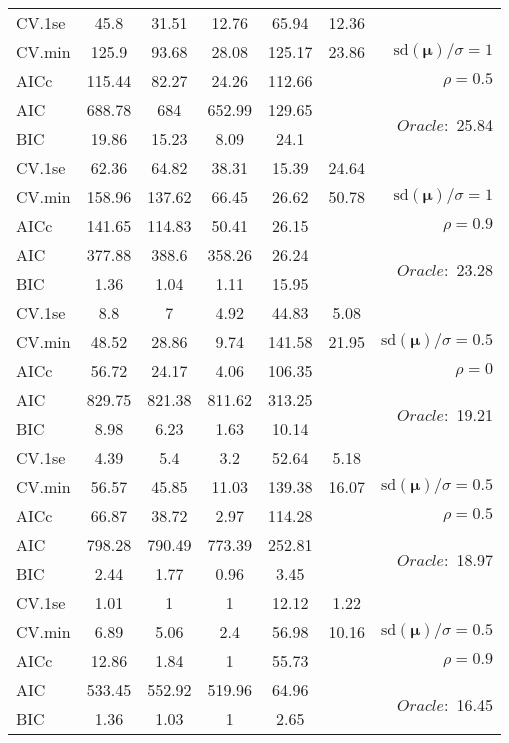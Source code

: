 \begin{table}
\begin{center}
\begin{tabular}{l*{5}{c}|r}
 \hline 
CV.1se & 45.8 & 31.51 & 12.76 & 65.94 & 12.36 & \\
CV.min & 125.9 & 93.68 & 28.08 & 125.17 & 23.86 &  $\mathrm{sd}(\mathbf{\mu})/\sigma=1$ \\
AICc & 115.44 & 82.27 & 24.26 & 112.66 & & $\rho=0.5$ \\
AIC & 688.78 & 684 & 652.99 & 129.65 & &  \multirow{2}{*}{$Oracle: $ 25.84} \\
BIC & 19.86 & 15.23 & 8.09 & 24.1 & &  \\
 \hline 
CV.1se & 62.36 & 64.82 & 38.31 & 15.39 & 24.64 & \\
CV.min & 158.96 & 137.62 & 66.45 & 26.62 & 50.78 &  $\mathrm{sd}(\mathbf{\mu})/\sigma=1$ \\
AICc & 141.65 & 114.83 & 50.41 & 26.15 & & $\rho=0.9$ \\
AIC & 377.88 & 388.6 & 358.26 & 26.24 & &  \multirow{2}{*}{$Oracle: $ 23.28} \\
BIC & 1.36 & 1.04 & 1.11 & 15.95 & &  \\
 \hline 
CV.1se & 8.8 & 7 & 4.92 & 44.83 & 5.08 & \\
CV.min & 48.52 & 28.86 & 9.74 & 141.58 & 21.95 &  $\mathrm{sd}(\mathbf{\mu})/\sigma=0.5$ \\
AICc & 56.72 & 24.17 & 4.06 & 106.35 & & $\rho=0$ \\
AIC & 829.75 & 821.38 & 811.62 & 313.25 & &  \multirow{2}{*}{$Oracle: $ 19.21} \\
BIC & 8.98 & 6.23 & 1.63 & 10.14 & &  \\
 \hline 
CV.1se & 4.39 & 5.4 & 3.2 & 52.64 & 5.18 & \\
CV.min & 56.57 & 45.85 & 11.03 & 139.38 & 16.07 &  $\mathrm{sd}(\mathbf{\mu})/\sigma=0.5$ \\
AICc & 66.87 & 38.72 & 2.97 & 114.28 & & $\rho=0.5$ \\
AIC & 798.28 & 790.49 & 773.39 & 252.81 & &  \multirow{2}{*}{$Oracle: $ 18.97} \\
BIC & 2.44 & 1.77 & 0.96 & 3.45 & &  \\
 \hline 
CV.1se & 1.01 & 1 & 1 & 12.12 & 1.22 & \\
CV.min & 6.89 & 5.06 & 2.4 & 56.98 & 10.16 &  $\mathrm{sd}(\mathbf{\mu})/\sigma=0.5$ \\
AICc & 12.86 & 1.84 & 1 & 55.73 & & $\rho=0.9$ \\
AIC & 533.45 & 552.92 & 519.96 & 64.96 & &  \multirow{2}{*}{$Oracle: $ 16.45} \\
BIC & 1.36 & 1.03 & 1 & 2.65 & &  \\
 \hline 
\end{tabular}
\end{center}
\vspace{-1cm}
\end{table}




